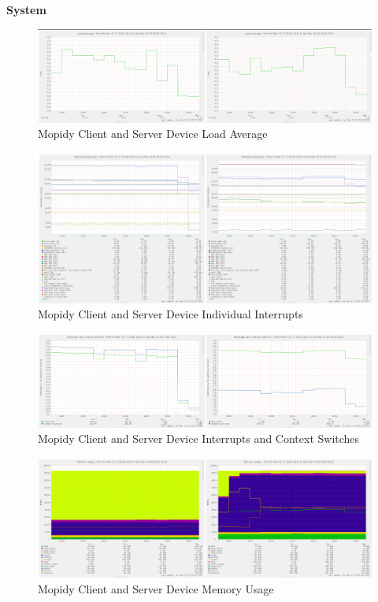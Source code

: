 \documentclass[11pt,a4paper,headinclude=false,footinclude=false]{scrreprt}
\begin{document}
\textbf{System}

\begin{figure}[H]
\includegraphics{ResultsAndAnalysis/MopidyServerTestImages/016MopidyLoadAverage.png}
\centering
\caption{Mopidy Client and Server Device Load Average}
\label{MopidyLoadAvg}
\end{figure}

\begin{figure}[H]
\includegraphics{ResultsAndAnalysis/MopidyServerTestImages/014MopidyIndividualInterrupts.png}
\centering
\caption{Mopidy Client and Server Device Individual Interrupts}
\label{MopidyIndInt}
\end{figure}

\begin{figure}[H]
\includegraphics{ResultsAndAnalysis/MopidyServerTestImages/015MopidyInterruptsAndContextSwitches.png}
\centering
\caption{Mopidy Client and Server Device Interrupts and Context Switches}
\label{MopidyIntCont}
\end{figure}

\begin{figure}[H]
\includegraphics{ResultsAndAnalysis/MopidyServerTestImages/017MopidyMemoryUsage.png}
\centering
\caption{Mopidy Client and Server Device Memory Usage}
\label{MopidyMemUse}
\end{figure}
\end{document}
